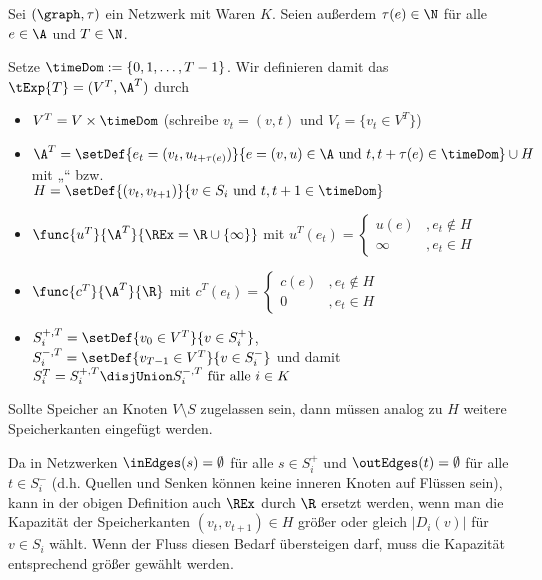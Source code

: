 \begin{definition}
    Sei $(\graph, \tau)$ ein Netzwerk mit Waren $K$. Seien außerdem
    $\tau(e) \in \N$ für alle $e \in \A$ und $T \in \N$.

    Setze $\timeDom := \{0, 1, \ldots, T-1\}$. Wir definieren damit das
     $\tExp{T} = (V^T, \A^T)$ durch
    \begin{itemize}
        \item $V^T = V \times \timeDom$ (schreibe $v_t = (v, t)$ und
            $V_t = \{v_t \in V^T\}$)
        \item $\A^T = \setDef{e_t = (v_t, u_{t + \tau(e)})}
                        {e = (v, u) \in \A \text{ und } t, t + \tau(e) \in \timeDom}
                    \cup H$ \\
            mit „“ bzw.  \\
            $H = \setDef{(v_t, v_{t+1})}
                        {v \in S_i \text{ und } t, t + 1 \in \timeDom}$
        \item $\func{u^T}{\A^T}{\REx = \R \cup \{\infty\}}$ mit
                $u^T(e_t) = \begin{cases}
                    u(e)    &, e_t \not\in H \\
                    \infty  &, e_t \in H
                \end{cases}$
        \item $\func{c^T}{\A^T}{\R}$ mit
                $c^T(e_t) = \begin{cases}
                    c(e)    &, e_t \not\in H \\
                    0       &, e_t \in H
                \end{cases}$
        \item $S_i^{+,T} = \setDef{v_0 \in V^T}{v \in S_i^+}$, \\
                $S_i^{-,T} = \setDef{v_{T-1} \in V^T}{v \in S_i^-}$ und damit \\
                $S_i^T = S_i^{+,T} \disjUnion S_i^{-,T} \text{ für alle } i \in K$
    \end{itemize}
    Sollte Speicher an Knoten $V \setminus S$ zugelassen sein, dann müssen analog
    zu $H$ weitere Speicherkanten eingefügt werden.
\end{definition}

\begin{remark}
    Da in Netzwerken $\inEdges(s) = \emptyset$ für alle $s \in S_i^+$ und
    $\outEdges(t) = \emptyset$ für alle $t \in S_i^-$ (d.h. Quellen und Senken
    können keine inneren Knoten auf Flüssen sein), kann in der obigen Definition
    auch $\REx$ durch $\R$ ersetzt werden, wenn man die Kapazität der
    Speicherkanten $(v_t, v_{t+1}) \in H$ größer oder gleich $|D_i(v)|$ für
    $v \in S_i$ wählt. Wenn der Fluss diesen Bedarf übersteigen darf,
    muss die Kapazität entsprechend größer gewählt werden.
\end{remark}

